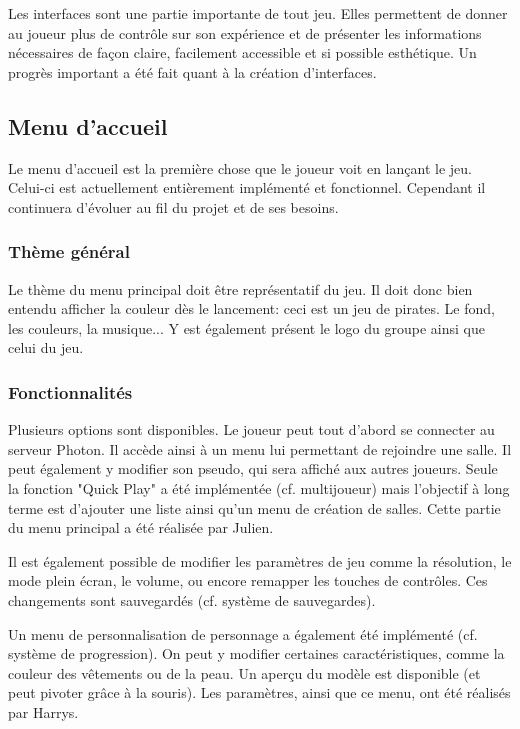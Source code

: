 \documentclass[../doc.tex]{subfiles}
\begin{document}
Les interfaces sont une partie importante de tout jeu. Elles permettent de donner 
au joueur plus de contrôle sur son expérience et de présenter les informations 
nécessaires de façon claire, facilement accessible et si possible esthétique.
Un progrès important a été fait quant à la création d'interfaces.

\subsection{Menu d'accueil}
    Le menu d'accueil est la première chose que le joueur voit en lançant le jeu.
    Celui-ci est actuellement entièrement implémenté et fonctionnel. Cependant il continuera 
    d'évoluer au fil du projet et de ses besoins.
    
    \subsubsection{Thème général}
    Le thème du menu principal doit être représentatif du jeu. Il doit donc bien entendu 
    afficher la couleur dès le lancement: ceci est un jeu de pirates.
    Le fond, les couleurs, la musique... Y est également présent le logo du 
    groupe ainsi que celui du jeu.
    
    \subsubsection{Fonctionnalités}
    Plusieurs options sont disponibles. Le joueur peut tout d'abord se connecter 
    au serveur Photon. Il accède ainsi à un menu lui permettant de rejoindre une 
    salle. Il peut également y modifier son pseudo, qui sera affiché aux autres 
    joueurs. Seule la fonction "Quick Play" a été implémentée (cf. multijoueur) mais 
    l'objectif à long terme est d'ajouter une liste ainsi qu'un menu de création de 
    salles. Cette partie du menu principal a été réalisée par Julien.
    
    Il est également possible de modifier les paramètres de jeu comme la 
    résolution, le mode plein écran, le volume, ou encore remapper les touches de 
    contrôles. Ces changements sont sauvegardés (cf. système de sauvegardes).
    
    Un menu de personnalisation de personnage a également été implémenté 
    (cf. système de progression). On peut y modifier certaines caractéristiques, 
    comme la couleur des vêtements ou de la peau. Un aperçu du modèle est disponible 
    (et peut pivoter grâce à la souris). Les paramètres, ainsi que ce menu, ont été 
    réalisés par Harrys.
    
\end{document}
